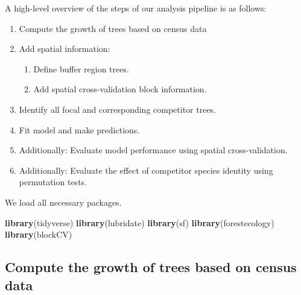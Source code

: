 \documentclass[12pt]{article}
\providecommand{\tightlist}{%
  \setlength{\itemsep}{0pt}\setlength{\parskip}{0pt}}
\newenvironment{Shaded}{\begin{snugshade}}{\end{snugshade}}
\newcommand{\KeywordTok}[1]{\textcolor[rgb]{0.13,0.29,0.53}{\textbf{#1}}}
\newcommand{\NormalTok}[1]{#1}
\begin{document}
A high-level overview of the steps of our analysis pipeline is as
follows:

\begin{enumerate}
\def\labelenumi{\arabic{enumi}.}
\tightlist
\item
  Compute the growth of trees based on census data
\item
  Add spatial information:

  \begin{enumerate}
  \def\labelenumii{\arabic{enumii}.}
  \tightlist
  \item
    Define buffer region trees.
  \item
    Add spatial cross-validation block information.
  \end{enumerate}
\item
  Identify all focal and corresponding competitor trees.
\item
  Fit model and make predictions.
\item
  Additionally: Evaluate model performance using spatial
  cross-validation.
\item
  Additionally: Evaluate the effect of competitor species identity using
  permutation tests.
\end{enumerate}

We load all necessary packages.

\begin{Shaded}
\begin{Highlighting}[]
\KeywordTok{library}\NormalTok{(tidyverse)}
\KeywordTok{library}\NormalTok{(lubridate)}
\KeywordTok{library}\NormalTok{(sf)}
\KeywordTok{library}\NormalTok{(forestecology)}
\KeywordTok{library}\NormalTok{(blockCV)}
\end{Highlighting}
\end{Shaded}

\hypertarget{compute-the-growth-of-trees-based-on-census-data}{%
\subsection{Compute the growth of trees based on census
data}\label{compute-the-growth-of-trees-based-on-census-data}}
\end{document}
